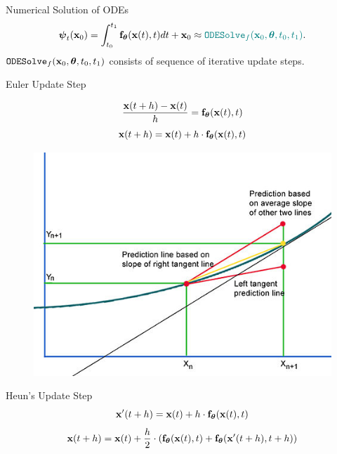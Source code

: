 \documentclass{beamer}
\begin{document}
\begin{frame}{Numerical Solution of ODEs}
	\[
		\boldsymbol{\psi}_t(\mathbf{x}_0) = \int^{t_1}_{t_0} \mathbf{f}_{\boldsymbol{\theta}}(\mathbf{x}(t), t) d t  + \mathbf{x}_0 \approx {\color{teal}\texttt{ODESolve}_f(\mathbf{x}_0, \boldsymbol{\theta}, t_0, t_1)}.
	\]
	$\texttt{ODESolve}_f(\mathbf{x}_0, \boldsymbol{\theta}, t_0, t_1)$ consists of sequence of iterative update steps.
	\eqpause
	\begin{block}{Euler Update Step}
		\begin{minipage}[t]{0.5\columnwidth}
			\vspace{-0.3cm}
			\[
	  			\frac{\mathbf{x}(t + h) - \mathbf{x}(t)}{h} = \mathbf{f}_{\boldsymbol{\theta}}(\mathbf{x}(t), t)
			\]
			\[
	  			\mathbf{x}(t + h) = \mathbf{x}(t) + h \cdot \mathbf{f}_{\boldsymbol{\theta}}(\mathbf{x}(t), t)
			\]
		\end{minipage}%
		\eqpause
		\begin{minipage}[t]{0.5\columnwidth}
			\vspace{-0.8cm}
			\begin{figure}
				\centering
				\includegraphics[width=\linewidth]{figs/heun_method}
			\end{figure}
		\end{minipage}
	\end{block}
	\vspace{-1.0cm}
	\begin{block}{Heun's Update Step}
		\vspace{-0.3cm}
		\[
			\mathbf{x}'(t + h) = \mathbf{x}(t) + h \cdot \mathbf{f}_{\boldsymbol{\theta}}(\mathbf{x}(t), t)
		\]
		\[
			\mathbf{x}(t + h) = \mathbf{x}(t) + \frac{h}{2} \cdot \left(\mathbf{f}_{\boldsymbol{\theta}}(\mathbf{x}(t), t) + \mathbf{f}_{\boldsymbol{\theta}}(\mathbf{x}'(t+h), t + h)\right)
		\]
	\end{block}
\end{frame}
\end{document}
